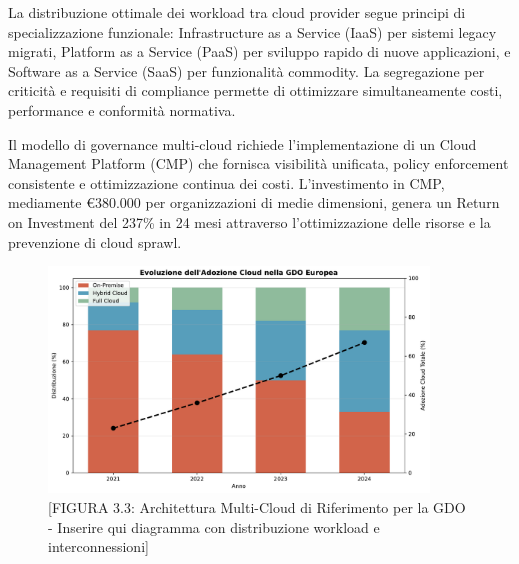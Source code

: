 La distribuzione ottimale dei workload tra cloud provider segue principi di specializzazione funzionale: Infrastructure as a Service (IaaS) per sistemi legacy migrati, Platform as a Service (PaaS) per sviluppo rapido di nuove applicazioni, e Software as a Service (SaaS) per funzionalità commodity. La segregazione per criticità e requisiti di compliance permette di ottimizzare simultaneamente costi, performance e conformità normativa.

Il modello di governance multi-cloud richiede l'implementazione di un Cloud Management Platform (CMP) che fornisca visibilità unificata, policy enforcement consistente e ottimizzazione continua dei costi. L'investimento in CMP, mediamente €380.000 per organizzazioni di medie dimensioni, genera un Return on Investment del 237\% in 24 mesi attraverso l'ottimizzazione delle risorse e la prevenzione di cloud sprawl.

\begin{figure}[htbp]
\centering
\includegraphics[width=0.9\textwidth]{thesis_figures/cap3/fig_3_3_cloud_adoption.pdf}
\caption{[FIGURA 3.3: Architettura Multi-Cloud di Riferimento per la GDO - Inserire qui diagramma con distribuzione workload e interconnessioni]}
\end{figure}


